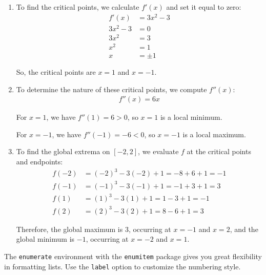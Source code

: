 \documentclass[11pt,a4paper]{article}
\begin{document}
\begin{enumerate}[label=(\alph*)]
    \item To find the critical points, we calculate $f'(x)$ and set it equal to zero:
    \begin{align}
        f'(x) &= 3x^2 - 3 \\
        3x^2 - 3 &= 0 \\
        3x^2 &= 3 \\
        x^2 &= 1 \\
        x &= \pm 1
    \end{align}
    
    So, the critical points are $x = 1$ and $x = -1$.
    
    \item To determine the nature of these critical points, we compute $f''(x)$:
    \begin{align}
        f''(x) = 6x
    \end{align}
    
    For $x = 1$, we have $f''(1) = 6 > 0$, so $x = 1$ is a local minimum.
    
    For $x = -1$, we have $f''(-1) = -6 < 0$, so $x = -1$ is a local maximum.
    
    \item To find the global extrema on $[-2, 2]$, we evaluate $f$ at the critical points and endpoints:
    \begin{align}
        f(-2) &= (-2)^3 - 3(-2) + 1 = -8 + 6 + 1 = -1 \\
        f(-1) &= (-1)^3 - 3(-1) + 1 = -1 + 3 + 1 = 3 \\
        f(1) &= (1)^3 - 3(1) + 1 = 1 - 3 + 1 = -1 \\
        f(2) &= (2)^3 - 3(2) + 1 = 8 - 6 + 1 = 3
    \end{align}
    
    Therefore, the global maximum is $3$, occurring at $x = -1$ and $x = 2$, and the global minimum is $-1$, occurring at $x = -2$ and $x = 1$.
\end{enumerate}

\begin{tipbox}
The \verb|enumerate| environment with the \verb|enumitem| package gives you great flexibility in formatting lists. Use the \verb|label| option to customize the numbering style.
\end{tipbox}

\end{document}
